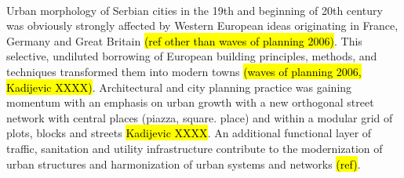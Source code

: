 \documentclass[11pt]{report}
\begin{document}
\\  
Urban morphology of Serbian cities in the 19th and beginning of 20th century was obviously strongly affected by Western European ideas originating in France, Germany and Great Britain \hl{(ref other than waves of planning 2006)}. This selective, undiluted borrowing of European building principles, methods, and techniques transformed them into modern towns \hl{(waves of planning 2006, Kadijevic XXXX)}. Architectural and city planning practice was gaining momentum with an emphasis on urban growth with a new orthogonal street network with central places (piazza, square. place) and within a modular grid of plots, blocks and streets \hl{Kadijevic XXXX}. An additional functional layer of traffic, sanitation and utility infrastructure contribute to the modernization of urban structures and harmonization of urban systems and networks \hl{(ref)}.
\end{document}
